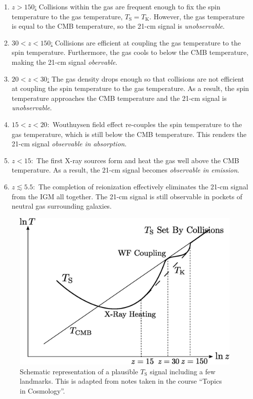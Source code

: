 \begin{enumerate}
\item [] \underline{$z > 150$:} Collisions within the gas are frequent enough to fix the spin temperature to the gas temperature, $T_{\text{S}} = T_{\text{K}}$. However, the gas temperature is equal to the CMB temperature, so the 21-cm signal is \textit{unobservable}.
\item [] \underline{$30 < z < 150$:} Collisions are efficient at coupling the gas temperature to the spin temperature. Furthermore, the gas cools to below the CMB temperature, making the 21-cm signal \textit{obervable}. 
\item [] \underline{$20 < z < 30$:} The gas density drops enough so that collisions are not efficient at coupling the spin temperature to the gas temperature. As a result, the spin temperature approaches the CMB temperature and the 21-cm signal is \textit{unobservable}. 
\item [] \underline{$15 < z < 20:$} Wouthuysen field effect re-couples the spin temperature to the gas temperature, which is still below the CMB temperature. This renders the 21-cm signal \textit{observable in absorption}. 
\item [] \underline{$ z < 15:$} The first X-ray sources form and heat the gas well above the CMB temperature. As a result, the 21-cm signal becomes \textit{observable in emission}.
\item [] \underline{$ z \lesssim 5.5:$} The completion of reionization effectively eliminates the 21-cm signal from the IGM all together. The 21-cm signal is still observable in pockets of neutral gas surrounding galaxies. 
\end{enumerate}


\begin{figure}[h]
  \centering
  \includegraphics[width=12cm]{TsEvolution.eps}
  \caption{Schematic representation of a plausible $T_{\text{S}}$ signal including a few landmarks. This is adapted from notes taken in the course ``Topics in Cosmology''.}
  \label{fig:TsEvolution}
\end{figure}



